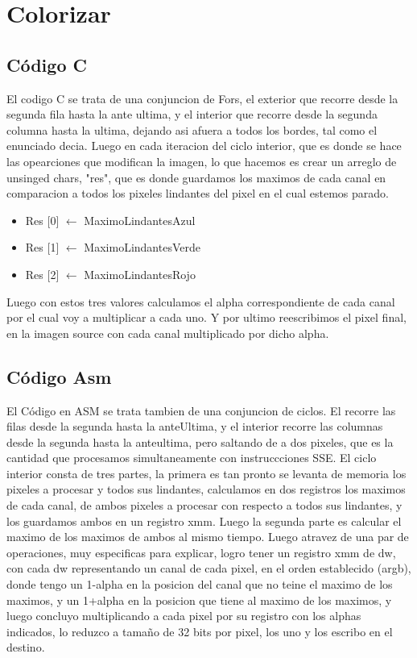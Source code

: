 \section{Colorizar}

\subsection{Código C}
	El codigo C se trata de una conjuncion de Fors, el exterior que recorre desde la segunda fila hasta la ante ultima,  y el interior que recorre desde la segunda columna hasta la ultima, dejando asi afuera a todos los bordes, tal como el enunciado decia. Luego en cada iteracion del ciclo interior, que es donde se hace las opearciones que modifican la imagen, lo que hacemos es crear un arreglo de unsinged chars, "res", que es  donde guardamos los maximos de cada canal en comparacion a todos  los pixeles lindantes del pixel en el cual estemos parado.
	\begin{itemize}
	\item {Res [0] $\leftarrow$ MaximoLindantesAzul}
	\item {Res [1] $\leftarrow$ MaximoLindantesVerde}
	\item {Res [2] $\leftarrow$ MaximoLindantesRojo}
	\end{itemize}
Luego con estos tres valores calculamos el alpha correspondiente de cada canal por el cual voy a multiplicar a cada uno. Y por ultimo reescribimos el pixel final, en la imagen source con cada canal multiplicado  por dicho alpha.

\subsection{Código Asm}
	El Código en ASM se trata tambien de una conjuncion de ciclos. El recorre las filas desde la segunda hasta la anteUltima, y el interior recorre las columnas desde la segunda hasta la anteultima, pero saltando de a dos pixeles, que es la cantidad que procesamos simultaneamente con instruccciones SSE. 
    El ciclo interior consta de tres partes, la primera es tan pronto se levanta de memoria los pixeles a procesar y todos sus lindantes, calculamos en dos registros los maximos de cada canal, de ambos pixeles a procesar con respecto a todos sus lindantes, y los guardamos ambos en un registro xmm. Luego la segunda parte es calcular el maximo de los maximos de ambos al mismo tiempo. Luego atravez de una par de operaciones, muy especificas para explicar, logro tener un registro xmm de dw, con cada dw representando un canal de cada pixel, en el orden establecido (argb), donde tengo un 1-alpha en la posicion del canal que no teine el maximo de los maximos, y un 1+alpha en la posicion que tiene al maximo de los maximos, y luego concluyo multiplicando a cada pixel por su registro con los alphas indicados, lo reduzco a tamaño de 32 bits por pixel, los uno y los escribo en el destino.
	
